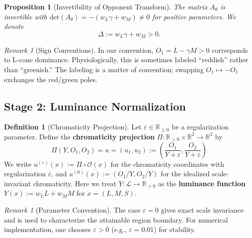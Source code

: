 \documentclass[11pt]{article}
\theoremstyle{plain}
\newtheorem{proposition}[theorem]{Proposition}
\theoremstyle{definition}
\newtheorem{definition}[theorem]{Definition}
\theoremstyle{remark}
\newtheorem{remark}[theorem]{Remark}
\newcommand{\R}{\mathbb{R}}
\newcommand{\Rnn}{\mathbb{R}_{\geq 0}}  %
\newcommand{\Rpp}{\mathbb{R}_{> 0}}     %
\newcommand{\Det}{\mathrm{det}}
\begin{document}
\begin{proposition}[Invertibility of Opponent Transform]
\label{prop:invertibility}
The matrix $A_\theta$ is invertible with $\Det(A_\theta) = -(w_L \gamma + w_M) \neq 0$ for positive parameters. We denote
\begin{equation}
\Delta := w_L \gamma + w_M > 0.
\end{equation}
\end{proposition}

\begin{remark}[Sign Conventions]
\label{rem:sign-conventions}
In our convention, $O_1 = L - \gamma M > 0$ corresponds to L-cone dominance. Physiologically, this is sometimes labeled ``reddish'' rather than ``greenish.'' The labeling is a matter of convention; swapping $O_1 \mapsto -O_1$ exchanges the red/green poles.
\end{remark}

\subsection{Stage 2: Luminance Normalization}

\begin{definition}[Chromaticity Projection]
\label{def:chromaticity}
Let $\varepsilon \in \Rnn$ be a regularization parameter. Define the \textbf{chromaticity projection} $\Pi: \Rpp \times \R^2 \to \R^2$ by
\begin{equation}
\boxed{
\Pi(Y, O_1, O_2) = u = (u_1, u_2) := \left( \frac{O_1}{Y + \varepsilon}, \frac{O_2}{Y + \varepsilon} \right)
}
\end{equation}
We write $u^{(\varepsilon)}(x) := \Pi \circ \mathcal{O}(x)$ for the chromaticity coordinates with regularization $\varepsilon$, and $u^{(0)}(x) := (O_1/Y, O_2/Y)$ for the idealized scale-invariant chromaticity. Here we treat $Y: \mathcal{L} \to \Rpp$ as the \textbf{luminance function} $Y(x) := w_L L + w_M M$ for $x = (L, M, S)$.
\end{definition}

\begin{remark}[Parameter Convention]
The case $\varepsilon = 0$ gives exact scale invariance and is used to characterize the attainable region boundary. For numerical implementation, one chooses $\varepsilon > 0$ (e.g., $\varepsilon = 0.01$) for stability.
\end{remark}
\end{document}
